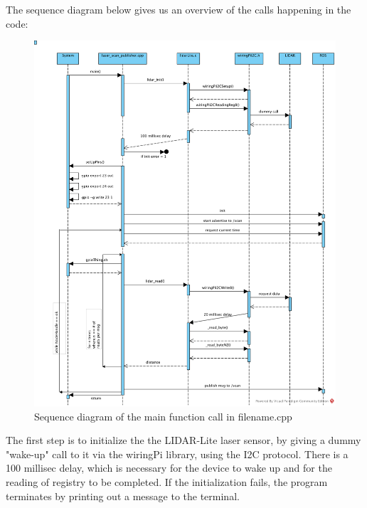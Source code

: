 

\clearpage
The sequence diagram below gives us an overview of the calls happening in the code:

\begin{figure}[H]
	\centering
	\includegraphics[scale=.6]{images/laser-module.png}
	\caption{Sequence diagram of the main function call in filename.cpp}
	\label{fig:lasermodule}
\end{figure}

The first step is to initialize the the LIDAR-Lite laser sensor, by giving a dummy "wake-up" call to it via the wiringPi library, using the I2C protocol. There is a 100 millisec delay, which is necessary for the device to wake up and for the reading of registry to be completed. If the initialization fails, the program terminates by printing out a message to the terminal.

